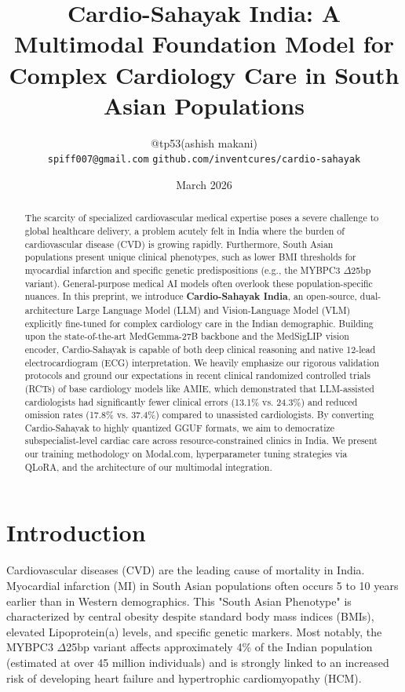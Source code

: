 \documentclass[11pt,a4paper]{article}
\title{\textbf{Cardio-Sahayak India: A Multimodal Foundation Model for Complex Cardiology Care in South Asian Populations}}
\author{
@tp53(ashish makani) \\
\texttt{spiff007@gmail.com}
\texttt{github.com/inventcures/cardio-sahayak}
}
\date{March 2026}
\begin{document}
\maketitle

\begin{abstract}
The scarcity of specialized cardiovascular medical expertise poses a severe challenge to global healthcare delivery, a problem acutely felt in India where the burden of cardiovascular disease (CVD) is growing rapidly. Furthermore, South Asian populations present unique clinical phenotypes, such as lower BMI thresholds for myocardial infarction and specific genetic predispositions (e.g., the MYBPC3 $\Delta$25bp variant). General-purpose medical AI models often overlook these population-specific nuances. In this preprint, we introduce \textbf{Cardio-Sahayak India}, an open-source, dual-architecture Large Language Model (LLM) and Vision-Language Model (VLM) explicitly fine-tuned for complex cardiology care in the Indian demographic. Building upon the state-of-the-art MedGemma-27B backbone and the MedSigLIP vision encoder, Cardio-Sahayak is capable of both deep clinical reasoning and native 12-lead electrocardiogram (ECG) interpretation. We heavily emphasize our rigorous validation protocols and ground our expectations in recent clinical randomized controlled trials (RCTs) of base cardiology models like AMIE, which demonstrated that LLM-assisted cardiologists had significantly fewer clinical errors (13.1\% vs. 24.3\%) and reduced omission rates (17.8\% vs. 37.4\%) compared to unassisted cardiologists. By converting Cardio-Sahayak to highly quantized GGUF formats, we aim to democratize subspecialist-level cardiac care across resource-constrained clinics in India. We present our training methodology on Modal.com, hyperparameter tuning strategies via QLoRA, and the architecture of our multimodal integration.
\end{abstract}

\section{Introduction}
Cardiovascular diseases (CVD) are the leading cause of mortality in India. Myocardial infarction (MI) in South Asian populations often occurs 5 to 10 years earlier than in Western demographics. This "South Asian Phenotype" is characterized by central obesity despite standard body mass indices (BMIs), elevated Lipoprotein(a) levels, and specific genetic markers. Most notably, the MYBPC3 $\Delta$25bp variant affects approximately 4\% of the Indian population (estimated at over 45 million individuals) and is strongly linked to an increased risk of developing heart failure and hypertrophic cardiomyopathy (HCM).
\end{document}
